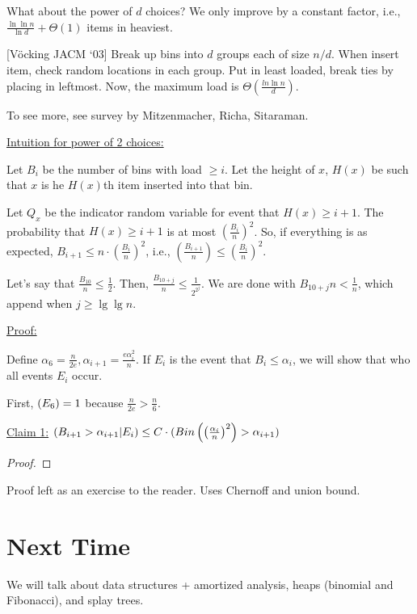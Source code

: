 \documentclass[11pt]{article}
\let\Pr\relax
\DeclareMathOperator*{\Pr}{\mathbb{P}}
\begin{document}
What about the power of $d$ choices? We only improve by a constant factor, i.e., $\frac{\ln\ln n}{\ln d} + \Theta(1)$
items in heaviest.

[V\"{o}cking JACM `03] Break up bins into $d$ groups each of size $n/d$. When insert item, check random
locations in each group. Put in least loaded, break ties by placing in leftmost. Now, the maximum load is
$\Theta\left(\frac{ln\ln n}{d}\right)$.

To see more, see survey by Mitzenmacher, Richa, Sitaraman.

\underline{Intuition for power of 2 choices:}

Let $B_i$ be the number of bins with load $\geq i$. Let the height of $x$, $H(x)$ be such that $x$ is he
$H(x)$th item inserted into that bin.

Let $Q_x$ be the indicator random variable for event that $H(x) \geq i + 1$. The probability that
$H(x) \geq i + 1$ is at most $\left(\frac{B_i}{n}\right)^2$. So, if everything is as expected,
$B_{i+1} \leq n \cdot \left(\frac{B_i}{n}\right)^2$, i.e., $\left(\frac{B_{i+1}}{n}\right) \leq \left(\frac{B_i}{n}\right)^2$.

Let's say that $\frac{B_{10}}{n} \leq \frac{1}{2}$. Then, $\frac{B_{10 + j}}{n} \leq \frac{1}{2^{2^j}}$. We
are done with $B_{10 + j}{n} < \frac{1}{n}$, which append when $j \geq \lg \lg n$.

\underline{Proof:}

Define $\alpha_6 = \frac{n}{2e}, \alpha_{i+1} = \frac{e \alpha_i^2}{n}$. If $E_i$ is the event that $B_i \leq \alpha_i$,
we will show that who all events $E_i$ occur.

First, $\Pr(E_6) = 1$ because $\frac{n}{2e} > \frac{n}{6}$.

\underline{Claim 1:} $\Pr(B_{i+1} > \alpha_{i+ 1} | E_i) \leq C \cdot \Pr(Bin\left(\left(\frac{\alpha_i}{n}\right)^2\right) > \alpha_{i+1})$
\begin{proof}

\end{proof}

Proof left as an exercise to the reader. Uses Chernoff and union bound.

\section{Next Time}

We will talk about data structures + amortized analysis, heaps (binomial and Fibonacci), and splay
trees.
\end{document}
